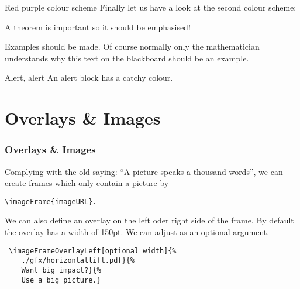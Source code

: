 {
	\begin{frame}{Red purple colour scheme}
		Finally let us have a look at the second colour scheme:
		
		\begin{theorem}
			A theorem is important so it should be emphasised!
		\end{theorem}
	
		\begin{example}
			Examples should be made. Of course normally only the mathematician understands why this text on the blackboard should be an example.
		\end{example}
	
		\begin{alertblock}{Alert, alert}
			An alert block has a catchy colour.
		\end{alertblock}
	\end{frame}
}


\section{Overlays \& Images}
\begin{frame}[fragile]
	\frametitle{Overlays \& Images}
	Complying with the old saying: \enquote{A picture speaks a thousand words}, we can create frames which only contain a picture by
	\begin{center}
		\texttt{\textbackslash imageFrame\{imageURL\}.}
	\end{center}
	We can also define an overlay on the left oder right side of the frame. By default the overlay has a width of 150pt. We can adjust as an optional argument.
	\begin{verbatim} \imageFrameOverlayLeft[optional width]{%
    ./gfx/horizontallift.pdf}{%
    Want big impact?}{%
    Use a big picture.} \end{verbatim}
\end{frame}




